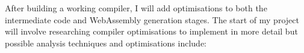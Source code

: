 \documentclass[12pt]{article}
\begin{document}


After building a working compiler, I will add optimisations to both the intermediate code and WebAssembly generation stages. The start of my project will involve researching compiler optimisations to implement in more detail but possible analysis techniques and optimisations include:


\end{document}
